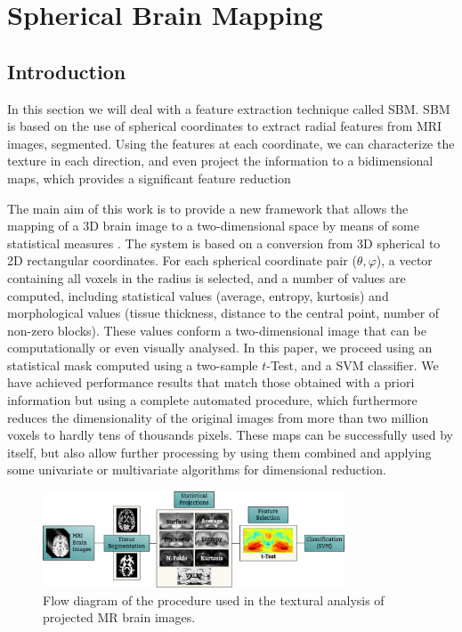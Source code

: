 \chapter{Spherical Brain Mapping}\label{ch:sbm}
\section{Introduction}
In this section we will deal with a feature extraction technique called \acf{SBM}. \ac{SBM} is based on the use of spherical coordinates to extract radial features from \ac{MRI} images, segmented. Using the features at each coordinate, we can characterize the texture in each direction, and even project the information to a bidimensional maps, which provides a significant feature reduction  


The main aim of this work is to provide a new framework that allows the mapping  of a 3D brain image to a two-dimensional space by means of some statistical measures \cite{Martinez-Murcia2015}. The system is based on a conversion from 3D spherical to 2D rectangular coordinates. For each spherical coordinate pair ($\theta,\varphi$), a vector containing all voxels  in the radius is selected, and a number of values are computed, including statistical values (average, entropy, kurtosis) and morphological values (tissue thickness, distance to the central point, number of non-zero blocks). These values conform a two-dimensional image that can be computationally or even visually analysed. In this paper, we proceed using an statistical mask computed using a two-sample $t$-Test, and a SVM classifier. We have achieved performance results that match those obtained with a priori information but using a complete automated procedure, which furthermore reduces the dimensionality of the original images from more than two million voxels to hardly tens of thousands pixels. These maps can be successfully used by itself, but also allow further processing by using them combined and applying some univariate or multivariate algorithms for dimensional reduction. 


\begin{figure}[htp]
	\centering
	\includegraphics[width=0.8\textwidth]{Graphics/ch6/01-flowdiagram}
	\caption{Flow diagram of the procedure used in the textural analysis of projected MR brain images.}
	\label{fig:flowdiagram}
\end{figure}

